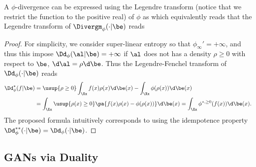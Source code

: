 \begin{proposition}
	A $\phi$-divergence can be expressed using the Legendre transform 
	(notice that we restrict the function to the positive real)
	of $\phi$ as %
	which equivalently reads that the Legendre transform of $\Divergm_\phi(\cdot|\be)$ reads
\end{proposition}

\begin{proof} 
	For simplicity, we consider super-linear entropy so that $\phi_\infty'=+\infty$, and thus this impose $\Dd_\phi(\al|\be)=+\infty$ if $\al$ does not has a density $\rho \geq 0$ with respect to $\be$, $\d\al=\rho \d\be$. Thus the Legendre-Fenchel transform of $\Dd_\phi(\cdot|\be)$
	reads
	\begin{align*}
		\Dd_\phi^*(f|\be) &= \usup{\rho \geq 0} \int_\Xx f(x) \rho(x)\d\be(x) - \int_\Xx \phi(\rho(x)) \d\be(x)\\
		&=  \int_\Xx \usup{\rho(x) \geq 0} \pa{  f(x) \rho(x) -\phi(\rho(x))  }\d\be(x) 
		= \int_\Xx \phi^{*,\geq 0}(f(x)) \d\be(x).
	\end{align*}
	The proposed formula intuitively corresponds to using the idempotence property  $\Dd_\phi^{**}(\cdot|\be)=\Dd_\phi(\cdot|\be)$.
\end{proof} 


\subsection{GANs via Duality}

